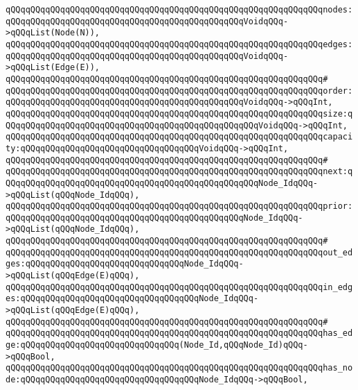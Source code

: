 \newline
\verb|qQQqqQQqqQQqqQQqqQQqqQQqqQQqqQQqqQQqqQQqqQQqqQQqqQQqqQQqqQQqqQQqnodes:qQQqqQQqqQQqqQQqqQQqqQQqqQQqqQQqqQQqqQQqqQQqqQQqVoidqQQq->qQQqList(Node(N)),|\newline
\verb|qQQqqQQqqQQqqQQqqQQqqQQqqQQqqQQqqQQqqQQqqQQqqQQqqQQqqQQqqQQqqQQqedges:qQQqqQQqqQQqqQQqqQQqqQQqqQQqqQQqqQQqqQQqqQQqqQQqVoidqQQq->qQQqList(Edge(E)),|\newline
\verb|qQQqqQQqqQQqqQQqqQQqqQQqqQQqqQQqqQQqqQQqqQQqqQQqqQQqqQQqqQQqqQQq#|\newline
\verb|qQQqqQQqqQQqqQQqqQQqqQQqqQQqqQQqqQQqqQQqqQQqqQQqqQQqqQQqqQQqqQQqorder:qQQqqQQqqQQqqQQqqQQqqQQqqQQqqQQqqQQqqQQqqQQqqQQqVoidqQQq->qQQqInt,|\newline
\verb|qQQqqQQqqQQqqQQqqQQqqQQqqQQqqQQqqQQqqQQqqQQqqQQqqQQqqQQqqQQqqQQqsize:qQQqqQQqqQQqqQQqqQQqqQQqqQQqqQQqqQQqqQQqqQQqqQQqqQQqVoidqQQq->qQQqInt,|\newline
\verb|qQQqqQQqqQQqqQQqqQQqqQQqqQQqqQQqqQQqqQQqqQQqqQQqqQQqqQQqqQQqqQQqcapacity:qQQqqQQqqQQqqQQqqQQqqQQqqQQqqQQqqQQqVoidqQQq->qQQqInt,|\newline
\verb|qQQqqQQqqQQqqQQqqQQqqQQqqQQqqQQqqQQqqQQqqQQqqQQqqQQqqQQqqQQqqQQq#|\newline
\verb|qQQqqQQqqQQqqQQqqQQqqQQqqQQqqQQqqQQqqQQqqQQqqQQqqQQqqQQqqQQqqQQqnext:qQQqqQQqqQQqqQQqqQQqqQQqqQQqqQQqqQQqqQQqqQQqqQQqqQQqNode_IdqQQq->qQQqList(qQQqNode_IdqQQq),|\newline
\verb|qQQqqQQqqQQqqQQqqQQqqQQqqQQqqQQqqQQqqQQqqQQqqQQqqQQqqQQqqQQqqQQqprior:qQQqqQQqqQQqqQQqqQQqqQQqqQQqqQQqqQQqqQQqqQQqqQQqNode_IdqQQq->qQQqList(qQQqNode_IdqQQq),|\newline
\verb|qQQqqQQqqQQqqQQqqQQqqQQqqQQqqQQqqQQqqQQqqQQqqQQqqQQqqQQqqQQqqQQq#|\newline
\verb|qQQqqQQqqQQqqQQqqQQqqQQqqQQqqQQqqQQqqQQqqQQqqQQqqQQqqQQqqQQqqQQqout_edges:qQQqqQQqqQQqqQQqqQQqqQQqqQQqqQQqNode_IdqQQq->qQQqList(qQQqEdge(E)qQQq),|\newline
\verb|qQQqqQQqqQQqqQQqqQQqqQQqqQQqqQQqqQQqqQQqqQQqqQQqqQQqqQQqqQQqqQQqin_edges:qQQqqQQqqQQqqQQqqQQqqQQqqQQqqQQqqQQqNode_IdqQQq->qQQqList(qQQqEdge(E)qQQq),|\newline
\verb|qQQqqQQqqQQqqQQqqQQqqQQqqQQqqQQqqQQqqQQqqQQqqQQqqQQqqQQqqQQqqQQq#|\newline
\verb|qQQqqQQqqQQqqQQqqQQqqQQqqQQqqQQqqQQqqQQqqQQqqQQqqQQqqQQqqQQqqQQqhas_edge:qQQqqQQqqQQqqQQqqQQqqQQqqQQqqQQq(Node_Id,qQQqNode_Id)qQQq->qQQqBool,|\newline
\verb|qQQqqQQqqQQqqQQqqQQqqQQqqQQqqQQqqQQqqQQqqQQqqQQqqQQqqQQqqQQqqQQqhas_node:qQQqqQQqqQQqqQQqqQQqqQQqqQQqqQQqqQQqNode_IdqQQq->qQQqBool,|\newline
